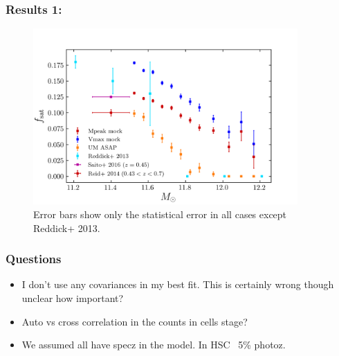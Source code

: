 \documentclass[t]{beamer}
\begin{document}
\begin{frame}
    \frametitle{Results 1: \fsat{}}

    \begin{figure}
    \includegraphics[width=0.9\textwidth]{images/sat_frac.png}
    \caption{Error bars show only the statistical error in all cases except Reddick+ 2013.}
    \end{figure}
\end{frame}

\begin{frame}
    \frametitle{Questions}
    \begin{itemize}
        \item I don't use any covariances in my best fit. This is certainly wrong though unclear how important?
        \item Auto vs cross correlation in the counts in cells stage?
        \item We assumed all have specz in the model. In HSC ~5\% photoz.
    \end{itemize}
\end{frame}
\end{document}
